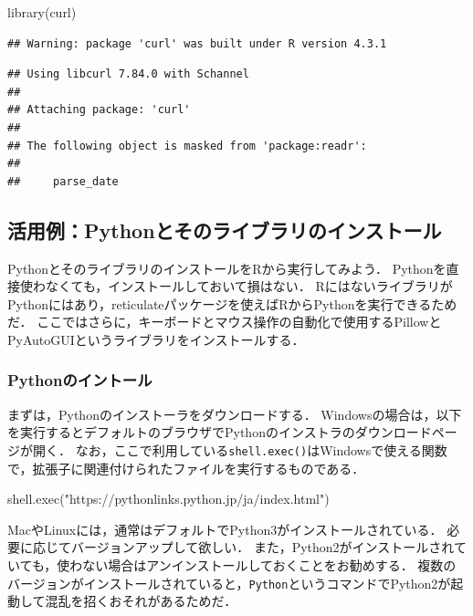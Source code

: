 \documentclass[
]{article}
\newenvironment{Shaded}{\begin{snugshade}}{\end{snugshade}}
\newcommand{\FunctionTok}[1]{\textcolor[rgb]{0.00,0.00,0.00}{#1}}
\newcommand{\NormalTok}[1]{#1}
\newcommand{\StringTok}[1]{\textcolor[rgb]{0.31,0.60,0.02}{#1}}
\begin{document}
\begin{Shaded}
\begin{Highlighting}[]
\FunctionTok{library}\NormalTok{(curl)}
\end{Highlighting}
\end{Shaded}

\begin{verbatim}
## Warning: package 'curl' was built under R version 4.3.1
\end{verbatim}

\begin{verbatim}
## Using libcurl 7.84.0 with Schannel
## 
## Attaching package: 'curl'
## 
## The following object is masked from 'package:readr':
## 
##     parse_date
\end{verbatim}

\hypertarget{install_python}{%
\subsection{活用例：Pythonとそのライブラリのインストール}\label{install_python}}

PythonとそのライブラリのインストールをRから実行してみよう．
Pythonを直接使わなくても，インストールしておいて損はない．
RにはないライブラリがPythonにはあり，reticulateパッケージを使えばRからPythonを実行できるためだ．
ここではさらに，キーボードとマウス操作の自動化で使用するPillowとPyAutoGUIというライブラリをインストールする．

\hypertarget{pythonux306eux30a4ux30f3ux30c8ux30fcux30eb}{%
\subsubsection{Pythonのイントール}\label{pythonux306eux30a4ux30f3ux30c8ux30fcux30eb}}

まずは，Pythonのインストーラをダウンロードする．
Windowsの場合は，以下を実行するとデフォルトのブラウザでPythonのインストラのダウンロードページが開く．
なお，ここで利用している\texttt{shell.exec()}はWindowsで使える関数で，拡張子に関連付けられたファイルを実行するものである．

\begin{Shaded}
\begin{Highlighting}[]
\FunctionTok{shell.exec}\NormalTok{(}\StringTok{"https://pythonlinks.python.jp/ja/index.html"}\NormalTok{)}
\end{Highlighting}
\end{Shaded}

MacやLinuxには，通常はデフォルトでPython3がインストールされている．
必要に応じてバージョンアップして欲しい．
また，Python2がインストールされていても，使わない場合はアンインストールしておくことをお勧めする．
複数のバージョンがインストールされていると，\texttt{Python}というコマンドでPython2が起動して混乱を招くおそれがあるためだ．
\end{document}
